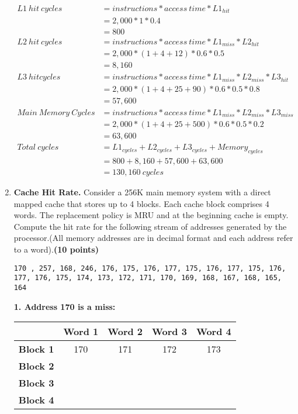 \documentclass[a4paper, 11pt]{exam}
\begin{document}
\begin{enumerate}
\begin{align*}
L1 \ hit \ cycles &= instructions * access \ time * L1_{hit} \\ 
            &= 2,000 * 1 * 0.4 \\
            &= 800 \\
L2 \ hit \ cycles &= instructions * access \ time * L1_{miss} * L2_{hit} \\
            &= 2,000 * (1 + 4 + 12) * 0.6 * 0.5\\
            &= 8,160 \\
L3 \ hit cycles &= instructions * access \ time * L1_{miss} * L2_{miss} * L3_{hit}\\
            &= 2,000 * (1 + 4 + 25 + 90) * 0.6 * 0.5 * 0.8\\
            &= 57,600\\
Main \ Memory \ Cycles &= instructions * access \ time * L1_{miss} * L2_{miss} * L3_{miss} \\
                       &= 2,000 * (1 + 4 + 25 + 500) * 0.6 * 0.5 * 0.2\\
                       &= 63,600\\
Total \ cycles &= L1_{cycles} + L2_{cycles} + L3_{cycles} + Memory_{cycles}\\
               &= 800 + 8,160 + 57,600 + 63,600 \\
               &= 130,160 \ cycles                      
\end{align*}

\newpage
\item \textbf{Cache Hit Rate.}
Consider a 256K main memory system with a direct mapped cache that stores up to 4 blocks. Each cache block comprises 4 words. The replacement policy is MRU and at the beginning cache is empty. Compute the hit rate for the following stream of addresses generated by the processor.(All memory addresses are in decimal format and each address refer to a word).\textbf{(10 points)}

\texttt{170 , 257, 168, 246, 176, 175, 176, 177, 175, 176, 177, 175, 176, 177, 176, 175, 174, 173, 172, 171, 170, 169, 168, 167, 168, 165, 164}

\textbf{1. Address 170 is a miss:}

\begin{center}
	\begin{tabular}{ |c|c|c|c|c| } 
		\hline
		&\textbf{Word 1}& \textbf{Word 2}& \textbf{Word 3} & \textbf{Word 4}\\ 
		\hline
		\textbf{Block 1} & 170 & 171  & 172 & 173\\ 
		\hline
		\textbf{Block 2} &  &   &  &\\ 
		\hline
		\textbf{Block 3} &  &   &  &\\ 
		\hline
		\textbf{Block 4} &  &   &  &\\ 
		\hline
	\end{tabular}
\end{center}


\end{enumerate}
\end{document}
